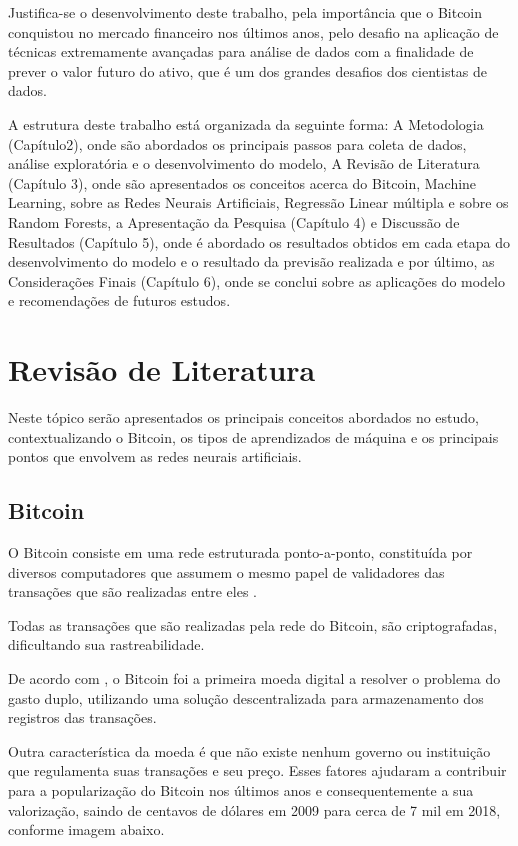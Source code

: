 \documentclass[12pt]{article}
\begin{document}
Justifica-se o desenvolvimento deste trabalho, pela importância que o Bitcoin
conquistou no mercado financeiro nos últimos anos, pelo desafio na aplicação de
técnicas extremamente avançadas para análise de dados com a finalidade de prever 
o valor futuro do ativo, que é um dos grandes desafios dos cientistas de dados.

A estrutura deste trabalho está organizada da seguinte forma: 
A Metodologia (Capítulo2), onde são abordados os principais passos para 
coleta de dados, análise exploratória e o desenvolvimento do modelo, A Revisão 
de Literatura (Capítulo 3), onde são apresentados os conceitos acerca do 
Bitcoin, Machine Learning,  sobre as Redes Neurais Artificiais, Regressão Linear 
múltipla e sobre os Random Forests, a Apresentação 
da Pesquisa (Capítulo 4) e Discussão de Resultados (Capítulo 5), onde é abordado 
os resultados obtidos em cada etapa do desenvolvimento do modelo e o 
resultado da previsão realizada e por último, as Considerações Finais 
(Capítulo 6), onde se conclui sobre as aplicações do modelo e recomendações de 
futuros estudos.

\section{Revisão de Literatura}

Neste tópico serão apresentados os principais conceitos abordados no estudo,
contextualizando o Bitcoin, os tipos de aprendizados de máquina e os principais 
pontos que envolvem as redes neurais artificiais.

\subsection{Bitcoin}

O Bitcoin consiste em uma rede estruturada ponto-a-ponto, constituída por 
diversos computadores que assumem o mesmo papel de validadores das transações 
que são realizadas entre eles \cite{nakamoto2019bitcoin}.

Todas as transações que são realizadas pela rede do Bitcoin, são criptografadas,
dificultando sua rastreabilidade.

De acordo com \cite{shawn:2017}, o Bitcoin foi a primeira moeda digital a 
resolver o problema do gasto duplo, utilizando uma solução descentralizada para 
armazenamento dos registros das transações.

Outra característica da moeda é que não existe nenhum governo ou instituição que
regulamenta suas transações e seu preço. Esses fatores ajudaram a contribuir 
para a popularização do Bitcoin nos últimos anos e consequentemente a sua 
valorização, saindo de centavos de dólares em 2009 para cerca de 7 mil em 2018, 
conforme imagem abaixo.
\end{document}
